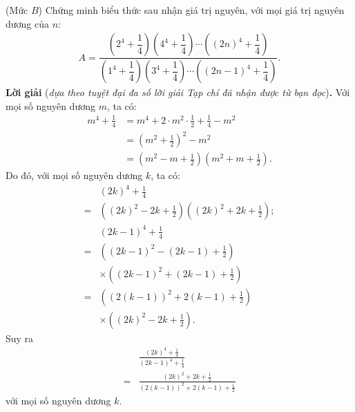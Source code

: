 \begin{multicols}{2}
	\vskip 0.05cm
	{}
	(Mức $B$) Chứng minh biểu thức sau nhận giá trị nguyên, với mọi giá trị nguyên dương của $n$:
	\begin{align*}
		A\!=\!\dfrac{\left(2^4\!+\!\dfrac14\right)\!\left(4^4\!+\!\dfrac14\right)\!\cdots\! \left((2n)^4\!+\!\dfrac14\right)}{\left(1^4\!+\!\dfrac14\right)\left(3^4\!+\!\dfrac14\right)\!\cdots\! \left((2n\!-\!1)^4\!+\!\dfrac14\right)}.
	\end{align*}
	\textbf{\color{thachthuctoanhoc}Lời giải} (\textit{dựa theo tuyệt đại đa số lời giải Tạp chí đã nhận được từ bạn đọc})\textbf{\color{thachthuctoanhoc}.}
	\vskip 0.05cm
	Với mọi số nguyên dương $m$, ta có:
	\begin{align*}
		{m^4} + \frac{1}{4} &= {m^4} + 2 \cdot {m^2} \cdot \frac{1}{2} + \frac{1}{4} - {m^2}\\[-0.6ex]
		& = {\left( {{m^2} + \frac{1}{2}} \right)^2} - {m^2}\\[-0.6ex]
		 &= \left( {{m^2} - m + \frac{1}{2}} \right)\left( {{m^2} + m + \frac{1}{2}} \right).
	\end{align*}
	Do đó, với mọi số nguyên dương $k$, ta có:
	\begin{align*}
		&{\left( {2k} \right)^4} + \frac{1}{4} \\[-0.6ex]
		= &\left( {{{\left( {2k} \right)}^2} - 2k + \frac{1}{2}} \right)\left( {{{\left( {2k} \right)}^2} + 2k + \frac{1}{2}} \right);\\[-0.6ex]
			&{\left( {2k - 1} \right)^4} + \frac{1}{4} \\[-0.6ex]
			= &\left(\left( {2k - 1} \right)^2 - \left( {2k - 1} \right) + \frac{1}{2}\right)\\[-0.6ex]
			&\times\left( \left( {2k - 1} \right)^2 + \left( {2k - 1} \right) + \frac{1}{2} \right)\\[-0.6ex]
			 = &\left( \left( 2\left( {k - 1} \right) \right)^2 + 2\left(k - 1 \right) + \frac{1}{2}\right)\\[-0.6ex]
			 &\times\left(\left( {2k} \right)^2 - 2k + \frac{1}{2}\right).
	\end{align*}
	Suy ra
	\begin{align*}
		&\frac{{{{\left( {2k} \right)}^4} + \frac{1}{4}}}{{{{\left( {2k - 1} \right)}^4} + \frac{1}{4}}} \\[-0.6ex]
		= &\frac{{{{\left( {2k} \right)}^2} + 2k + \frac{1}{2}}}{{{{\left( {2\left( {k - 1} \right)} \right)}^2} + 2\left( {k - 1} \right) + \frac{1}{2}}}
	\end{align*}
	với mọi số nguyên dương $k$.

\end{multicols}

